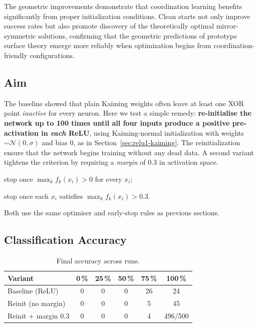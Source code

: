 The geometric improvements demonstrate that coordination learning benefits significantly from proper initialization conditions. Clean starts not only improve success rates but also promote discovery of the theoretically optimal mirror-symmetric solutions, confirming that the geometric predictions of prototype surface theory emerge more reliably when optimization begins from coordination-friendly configurations.


\subsection*{Aim}
The baseline showed that plain Kaiming weights often leave at least one
XOR point \emph{inactive} for every neuron.  
Here we test a simple remedy: \textbf{re-initialise the network up to 100 times 
until all four inputs produce a positive pre-activation in \emph{each} ReLU}, 
using Kaiming-normal initialization with weights \(\sim \mathcal{N}(0, \sigma)\) and bias \(0\), as in Section~\ref{sec:relu1-kaiming}.
The reinitialization ensure that the network begins training without any dead data.
A second variant tightens the criterion by requiring a \emph{margin}
of $0.3$ in activation space.

\begin{description}[leftmargin=2em,style=sameline]
  \item[\texttt{relu1\_reinit}]   stop once \(\max_k f_k(x_i) > 0\) for every \(x_i\);
  \item[\texttt{relu1\_reinit\_margin}] stop once each \(x_i\) satisfies
        \(\max_k f_k(x_i) > 0.3\).
\end{description}
Both use the same optimiser and early-stop rules as previous sections.

\subsection*{Classification Accuracy}

\begin{table}[ht]
\centering
\caption{Final accuracy across runs.}
\label{tab:relu1-reinit-accuracy}
\begin{tabular}{lccccc}
\toprule
Variant & 0\,\% & 25\,\% & 50\,\% & 75\,\% & 100\,\% \\
\midrule
Baseline (ReLU)       & 0 & 0 & 0 & 26 & 24 \\
Reinit (no margin)    & 0 & 0 & 0 & 5  & 45 \\
Reinit + margin 0.3   & 0 & 0 & 0 & 4  & 496/500 \\
\bottomrule
\end{tabular}
\end{table}

